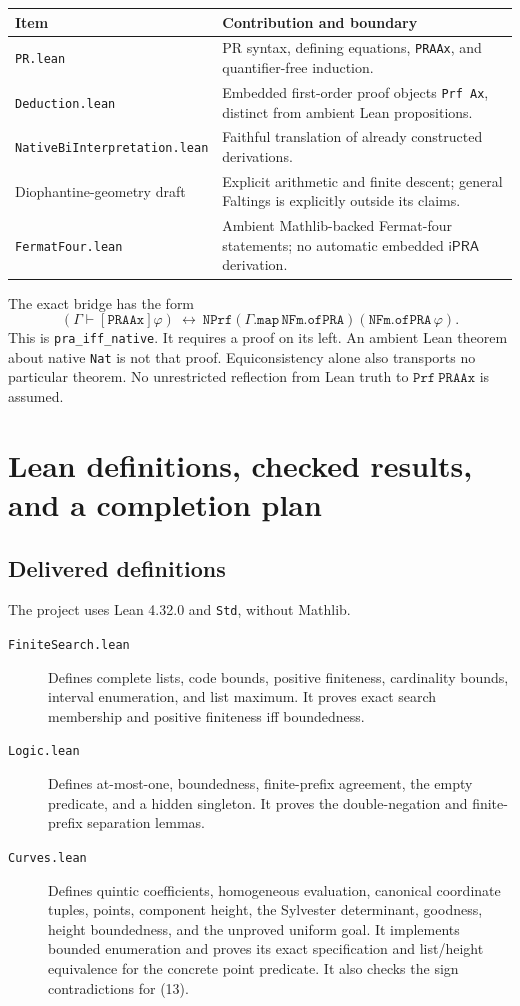 \documentclass[11pt,letterpaper]{article}
\newcommand{\iPRA}{\mathsf{iPRA}}
\theoremstyle{definition}
\begin{document}
\begin{center}
\begin{tabularx}{\textwidth}{@{}p{}X@{}}
\toprule
Item & Contribution and boundary\\ \midrule
\texttt{PR.lean} & PR syntax, defining equations, \texttt{PRAAx},
and quantifier-free induction.\\
\texttt{Deduction.lean} & Embedded first-order proof objects
\texttt{Prf Ax}, distinct from ambient Lean propositions.\\
\texttt{NativeBiInterpretation.lean} & Faithful translation of
already constructed derivations.\\
Diophantine-geometry draft & Explicit arithmetic and finite descent;
general Faltings is explicitly outside its claims.\\
\texttt{FermatFour.lean} & Ambient Mathlib-backed Fermat-four statements;
no automatic embedded $\iPRA$ derivation.\\
\bottomrule
\end{tabularx}
\end{center}

The exact bridge has the form
\[
 (\Gamma\vdash[\mathtt{PRAAx}]\varphi)
 \ \longleftrightarrow\
 \mathtt{NPrf}(\Gamma.\mathtt{map}\,\mathtt{NFm.ofPRA})
                    (\mathtt{NFm.ofPRA}\,\varphi).
\]
This is \texttt{pra\_iff\_native}. It requires a proof on its left.
An ambient Lean theorem about native \texttt{Nat} is not that proof.
Equiconsistency alone also transports no particular theorem.
No unrestricted reflection from Lean truth to $\mathtt{Prf\ PRAAx}$
is assumed.

\section{Lean definitions, checked results, and a completion plan}
\label{sec:lean}
\subsection{Delivered definitions}
The project uses Lean 4.32.0 and \texttt{Std}, without Mathlib.
\begin{description}
\item[\texttt{FiniteSearch.lean}]
Defines complete lists, code bounds, positive finiteness, cardinality
bounds, interval enumeration, and list maximum. It proves exact search
membership and positive finiteness iff boundedness.
\item[\texttt{Logic.lean}]
Defines at-most-one, boundedness, finite-prefix agreement, the empty
predicate, and a hidden singleton. It proves the double-negation and
finite-prefix separation lemmas.
\item[\texttt{Curves.lean}]
Defines quintic coefficients, homogeneous evaluation, canonical coordinate
tuples, points, component height, the Sylvester determinant, goodness,
height boundedness, and the unproved uniform goal. It implements
bounded enumeration and proves its exact specification and list/height
equivalence for the concrete point predicate. It also checks the sign
contradictions for (13).
\end{description}
\end{document}
